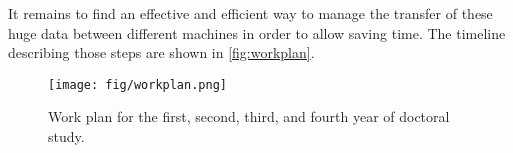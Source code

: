 It remains to find an effective and efficient way to manage the transfer of these huge data between different machines in order to allow saving time. The timeline describing those steps are shown in \autoref{fig:workplan}.


\begin{landscape}
\begin{figure}[!ht]
\centering
\texttt{[image: fig/workplan.png]}
\caption{Work plan for the first, second, third, and fourth year of doctoral study.}
\label{fig:workplan}
\end{figure}
\end{landscape}

\cleardoublepage
